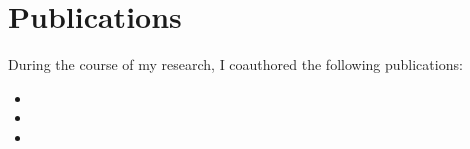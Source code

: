 \chapter{Publications}

During the course of my research, I coauthored the following publications:

\begin{itemize}
\item {}
\item {}
\item {}
\end{itemize}
